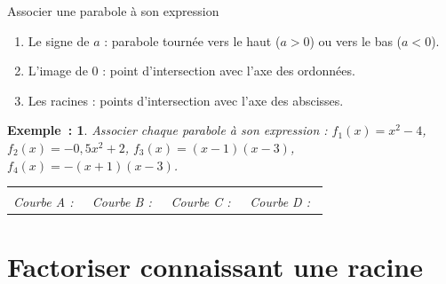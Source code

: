 \documentclass[12pt]{article}
\theoremstyle{break}
\newtheorem*{example}{Exemple~:}
\theoremstyle{inline}
\begin{document}
\begin{method}{Associer une parabole à son expression}{}
  \begin{enumerate}
    \item Le signe de $a$ : parabole tournée vers le haut ($a > 0$) ou vers le bas ($a < 0$).
    \item L'image de $0$ : point d'intersection avec l'axe des ordonnées.
    \item Les racines : points d'intersection avec l'axe des abscisses.
  \end{enumerate}
\end{method}

\begin{example}
  Associer chaque parabole à son expression : $f_1(x) = x^2 - 4$, \quad $f_2(x) = -0{,}5x^2 + 2$, \quad $f_3(x) = (x - 1)(x - 3)$, \quad $f_4(x) = -(x + 1)(x - 3)$.

  \medskip
  \noindent
  \begin{tabular}{@{}C{0.23\linewidth}C{0.23\linewidth}C{0.23\linewidth}C{0.23\linewidth}@{}}
    &
    &
    &
    \\
    Courbe A :  & Courbe B :  & Courbe C :  & Courbe D : 
  \end{tabular}
\end{example}

\section{Factoriser connaissant une racine}
\end{document}
